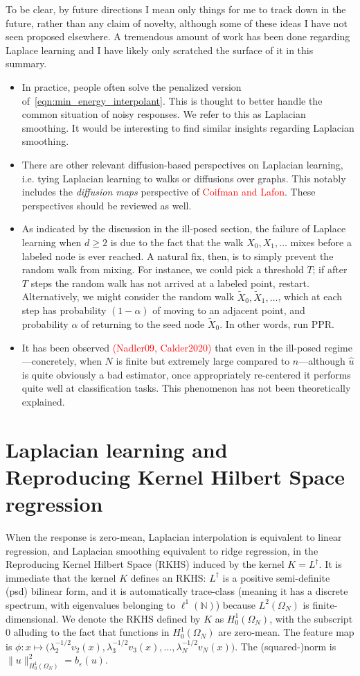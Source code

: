 \documentclass{article}
\newcommand{\1}{\mathbf{1}}
\newcommand{\wt}[1]{\widetilde{#1}}
\newcommand{\wh}[1]{\widehat{#1}}
\theoremstyle{definition}
\theoremstyle{remark}
\begin{document}
To be clear, by future directions I mean only things for me to track down in the future, rather than any claim of novelty, although some of these ideas I have not seen proposed elsewhere. A tremendous amount of work has been done regarding Laplace learning and I have likely only scratched the surface of it in this summary.
\begin{itemize}
	\item In practice, people often solve the penalized version of~\eqref{eqn:min_energy_interpolant}. This is thought to better handle the common situation of noisy responses. We refer to this as Laplacian smoothing. It would be interesting to find similar insights regarding Laplacian smoothing.
	\item There are other relevant diffusion-based perspectives on Laplacian learning, i.e. tying Laplacian learning to walks or diffusions over graphs. This notably includes the \emph{diffusion maps} perspective of \textcolor{red}{Coifman and Lafon}. These perspectives should be reviewed as well. 
	\item As indicated by the discussion in the ill-posed section, the failure of Laplace learning when $d \geq 2$ is due to the fact that the walk $X_0,X_1,\ldots$ mixes before a labeled node is ever reached. A natural fix, then, is to simply prevent the random walk from mixing. For instance, we could pick a threshold $T$; if after $T$ steps the random walk has not arrived at a labeled point, restart. Alternatively, we might consider the random walk $\wt{X}_0,\wt{X}_1,\ldots$, which at each step has probability $(1 - \alpha)$ of moving to an adjacent point, and probability $\alpha$ of returning to the seed node $\wt{X}_0$. In other words, run PPR.
	\item It has been observed \textcolor{red}{(Nadler09, Calder2020)} that even in the ill-posed regime---concretely, when $N$ is finite but extremely large compared to $n$---although $\wh{u}$ is quite obviously a bad estimator, once appropriately re-centered it performs quite well at classification tasks. This phenomenon has not been theoretically explained. 
\end{itemize}

\section{Laplacian learning and Reproducing Kernel Hilbert Space regression}
When the response is zero-mean, Laplacian interpolation is equivalent to linear regression, and Laplacian smoothing equivalent to ridge regression, in the Reproducing Kernel Hilbert Space (RKHS) induced by the kernel $K = L^{\dagger}$. It is immediate that the kernel $K$ defines an RKHS: $L^{\dagger}$ is a positive semi-definite (psd) bilinear form, and it is automatically trace-class (meaning it has a discrete spectrum, with eigenvalues belonging to $\ell^1(\mathbb{N})$) because $L^2(\Omega_N)$ is finite-dimensional. We denote the RKHS defined by $K$ as $H_0^1(\Omega_N)$, with the subscript $0$ alluding to the fact that functions in $H_0^1(\Omega_N)$ are zero-mean. The feature map is $\phi: x \mapsto \bigl(\lambda_2^{-1/2} v_2(x),\lambda_3^{-1/2} v_3(x),\ldots,\lambda_N^{-1/2} v_N(x)\bigr)$. The (squared-)norm is $\|u\|_{H_0^1(\Omega_N)}^2 = b_{\varepsilon}(u)$. 
\end{document}
